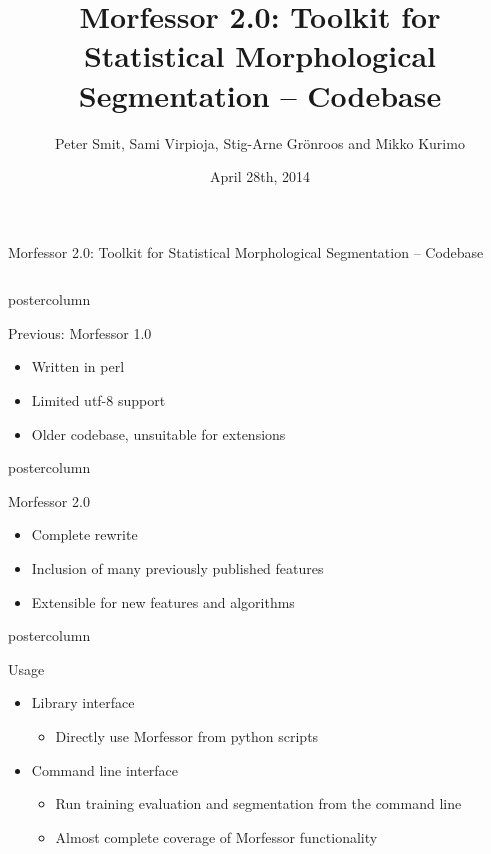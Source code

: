 \documentclass[final]{beamer} %
\title{Morfessor 2.0: Toolkit for Statistical Morphological Segmentation -- Codebase}
\author{Peter Smit, Sami Virpioja, Stig-Arne Gr\"onroos and Mikko Kurimo}
\institute[Aalto University]{Aalto University}
\date{April 28th, 2014}
\begin{document}
  \begin{frame}{Morfessor 2.0: Toolkit for Statistical Morphological Segmentation -- Codebase} 
\begin{columns}

\begin{column}{.3\textwidth}

      \begin{beamercolorbox}[center,wd=\textwidth]{postercolumn}
 \begin{block}{Previous: Morfessor 1.0}
                \begin{itemize}
                \item Written in perl
		\item Limited utf-8 support
		\item Older codebase, unsuitable for extensions

                \end{itemize}          
            \end{block}
            
	\end{beamercolorbox}

      \begin{beamercolorbox}[center,wd=\textwidth]{postercolumn}
 \begin{block}{Morfessor 2.0}
                \begin{itemize}
                \item Complete rewrite
		\item Inclusion of many previously published features
		\item Extensible for new features and algorithms
                \end{itemize}          
            \end{block}
            
	\end{beamercolorbox}


      \begin{beamercolorbox}[center,wd=\textwidth]{postercolumn}
 \begin{block}{Usage}
              \begin{itemize}
              \item Library interface
                \begin{itemize}
                \item Directly use Morfessor from python scripts
                \end{itemize}
              \item Command line interface
                \begin{itemize}
                \item Run training evaluation and segmentation from the command line
                \item Almost complete coverage of Morfessor functionality
                \end{itemize}
              \end{itemize}              
            \end{block}
            

\end{beamercolorbox}
\end{column}
\end{columns}
\end{frame}
\end{document}
